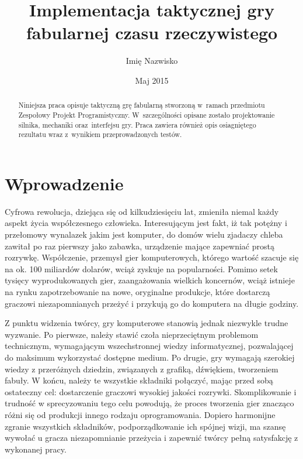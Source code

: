 \documentclass[licencjacka]{pracamgr}
\author	{Imię Nazwisko}
\title{Implementacja taktycznej gry fabularnej czasu rzeczywistego}
\date{Maj 2015}
\begin{document}
\maketitle

\begin{abstract}
  Niniejsza praca opisuje taktyczną grę fabularną stworzoną
  w~ramach przedmiotu Zespołowy Projekt Programistyczny.
  W~szczególności opisane zostało projektowanie silnika,
  mechaniki oraz~interfejsu gry. Praca zawiera również
  opis osiagniętego rezultatu wraz z~wynikiem przeprowadzonych testów.
\end{abstract}

\tableofcontents

\chapter*{Wprowadzenie}
Cyfrowa rewolucja, dziejąca się od kilkudziesięciu lat, zmieniła niemal każdy aspekt życia współczesnego człowieka.
Interesującym jest fakt, iż tak potężny i przełomowy wynalazek jakim jest komputer, do domów wielu zjadaczy chleba
zawitał po raz pierwszy jako zabawka, urządzenie mające zapewniać prostą rozrywkę. Współczenie, przemysł
gier komputerowych, którego wartość szacuje się na ok. 100 miliardów dolarów, wciąż zyskuje na popularności.
Pomimo setek tysięcy wyprodukowanych gier, zaangażowania wielkich koncernów, wciąż istnieje na rynku zapotrzebowanie
na nowe, oryginalne produkcje, które dostarczą graczowi niezapomnianych przeżyć i przykują go do komputera na długie godziny.

Z punktu widzenia twórcy, gry komputerowe stanowią jednak niezwykle trudne wyzwanie. Po pierwsze, należy stawić czoła
nieprzeciętnym problemom technicznym, wymagającym wszechstronnej wiedzy informatycznej, pozwalającej do maksimum wykorzystać
dostępne medium. Po drugie, gry wymagają szerokiej wiedzy z przeróżnych dziedzin, związanych z
grafiką, dźwiękiem, tworzeniem fabuły. W końcu, należy te wszystkie składniki połączyć, mając przed sobą ostateczny cel: dostarczenie
graczowi wysokiej jakości rozrywki. Skomplikowanie i trudność w sprecyzowaniu tego celu powodują, że proces tworzenia gier
znacząco różni się od produkcji innego rodzaju oprogramowania. Dopiero harmonijne zgranie wszystkich składników, podporządkowanie
ich spójnej wizji, ma szansę wywołać u gracza niezapomnianie przeżycia i zapewnić twórcy pełną satysfakcję z wykonanej pracy.
\end{document}
